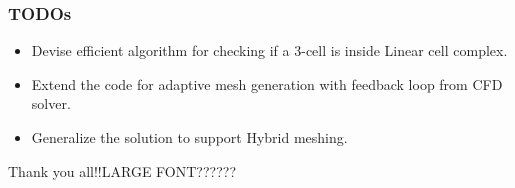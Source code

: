 \documentclass{beamer}
\begin{document}
	\begin{frame}
		\frametitle{TODOs}
			\begin{itemize}
				\item Devise efficient algorithm for checking if a 3-cell is inside Linear cell complex.
				\item Extend the code for adaptive mesh generation with feedback loop from CFD solver. 
				\item Generalize the solution to support Hybrid meshing. 		
			\end{itemize}
		\end{frame}	
	\begin{frame}
		Thank you all!!{LARGE FONT??????}
	\end{frame}	


\end{document}
